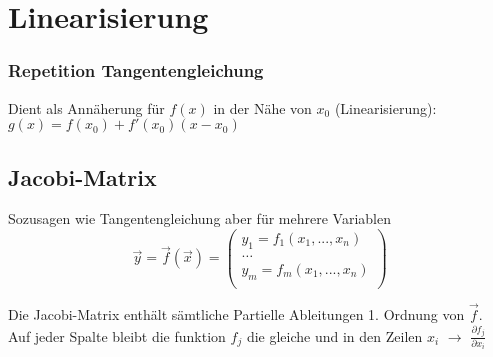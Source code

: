 \section{Linearisierung}

\subsubsection{Repetition Tangentengleichung}

Dient als Annäherung für $f(x)$ in der Nähe von $x_0$ (Linearisierung): \\
$g(x) = f(x_0) + f'(x_0)(x - x_0)$




\subsection{Jacobi-Matrix}
Sozusagen wie Tangentengleichung aber für mehrere Variablen
$$\vec{y} = \vec{f}(\vec{x}) =
	\begin{pmatrix}
		y_1 = f_1(x_1, ..., x_n) \\
		\hdots                   \\
		y_m = f_m(x_1, ..., x_n) \\
	\end{pmatrix}
$$

Die Jacobi-Matrix enthält sämtliche Partielle Ableitungen 1. Ordnung von $\vec{f}$. \\
Auf jeder Spalte bleibt die funktion $f_j$ die gleiche und in den
Zeilen $x_i$ $\rightarrow$ $\frac{\partial f_j}{\partial x_i}$













